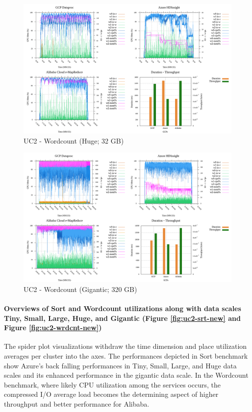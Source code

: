 \documentclass[review]{elsarticle}
\begin{document}
\begin{figure}[p]
	\caption{UC2 - Wordcount (Huge; 32 GB)}
	\label{fig:uc2-wrdcnt-h-cmidt}
	\includegraphics[width=\textwidth]{uc2-wrdcnt-h-cmidt}
	\centering
\end{figure}

\begin{figure}[p]
	\caption{UC2 - Wordcount (Gigantic; 320 GB)}
	\label{fig:uc2-wrdcnt-g-cmidt}
	\includegraphics[width=\textwidth]{uc2-wrdcnt-g-cmidt}
	\centering
\end{figure}

\paragraph{Overviews of Sort and Wordcount utilizations along with data scales Tiny, Small, Large, Huge, and Gigantic (Figure \ref{fig:uc2-srt-new} and Figure \ref{fig:uc2-wrdcnt-new})}The spider plot visualizations withdraw the time dimension and place utilization averages per cluster into the axes. The performances depicted in Sort benchmark show Azure's back falling performances in Tiny, Small, Large, and Huge data scales and its enhanced performance in the gigantic data scale. In the Wordcount benchmark, where likely CPU utilization among the services occurs, the compressed I/O average load becomes the determining aspect of higher throughput and better performance for Alibaba.
\end{document}
